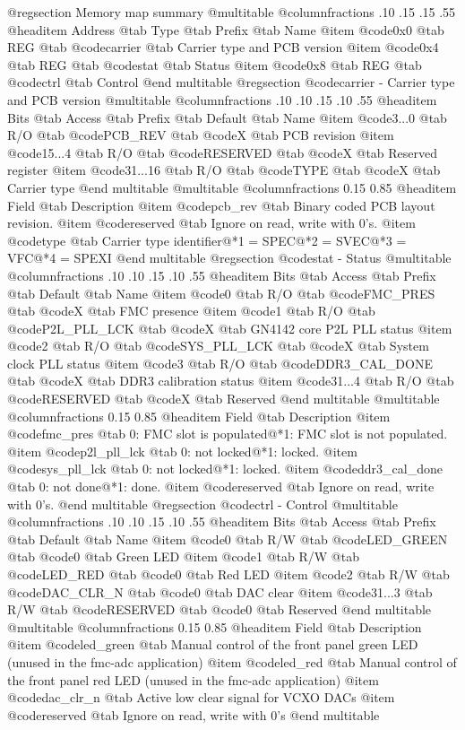 @regsection Memory map summary
@multitable  @columnfractions .10 .15 .15 .55
@headitem Address @tab Type @tab Prefix @tab Name
@item @code{0x0} @tab
REG @tab
@code{carrier} @tab
Carrier type and PCB version
@item @code{0x4} @tab
REG @tab
@code{stat} @tab
Status
@item @code{0x8} @tab
REG @tab
@code{ctrl} @tab
Control
@end multitable 
@regsection @code{carrier} - Carrier type and PCB version
@multitable @columnfractions .10 .10 .15 .10 .55
@headitem Bits @tab Access @tab Prefix @tab Default @tab Name
@item @code{3...0}
@tab R/O @tab
@code{PCB_REV}
@tab @code{X} @tab 
PCB revision
@item @code{15...4}
@tab R/O @tab
@code{RESERVED}
@tab @code{X} @tab 
Reserved register
@item @code{31...16}
@tab R/O @tab
@code{TYPE}
@tab @code{X} @tab 
Carrier type
@end multitable
@multitable @columnfractions 0.15 0.85
@headitem Field @tab Description
@item @code{pcb_rev} @tab Binary coded PCB layout revision.
@item @code{reserved} @tab Ignore on read, write with 0's.
@item @code{type} @tab Carrier type identifier@*1 = SPEC@*2 = SVEC@*3 = VFC@*4 = SPEXI
@end multitable
@regsection @code{stat} - Status
@multitable @columnfractions .10 .10 .15 .10 .55
@headitem Bits @tab Access @tab Prefix @tab Default @tab Name
@item @code{0}
@tab R/O @tab
@code{FMC_PRES}
@tab @code{X} @tab 
FMC presence
@item @code{1}
@tab R/O @tab
@code{P2L_PLL_LCK}
@tab @code{X} @tab 
GN4142 core P2L PLL status
@item @code{2}
@tab R/O @tab
@code{SYS_PLL_LCK}
@tab @code{X} @tab 
System clock PLL status
@item @code{3}
@tab R/O @tab
@code{DDR3_CAL_DONE}
@tab @code{X} @tab 
DDR3 calibration status
@item @code{31...4}
@tab R/O @tab
@code{RESERVED}
@tab @code{X} @tab 
Reserved
@end multitable
@multitable @columnfractions 0.15 0.85
@headitem Field @tab Description
@item @code{fmc_pres} @tab 0: FMC slot is populated@*1: FMC slot is not populated.
@item @code{p2l_pll_lck} @tab 0: not locked@*1: locked.
@item @code{sys_pll_lck} @tab 0: not locked@*1: locked.
@item @code{ddr3_cal_done} @tab 0: not done@*1: done.
@item @code{reserved} @tab Ignore on read, write with 0's.
@end multitable
@regsection @code{ctrl} - Control
@multitable @columnfractions .10 .10 .15 .10 .55
@headitem Bits @tab Access @tab Prefix @tab Default @tab Name
@item @code{0}
@tab R/W @tab
@code{LED_GREEN}
@tab @code{0} @tab 
Green LED
@item @code{1}
@tab R/W @tab
@code{LED_RED}
@tab @code{0} @tab 
Red LED
@item @code{2}
@tab R/W @tab
@code{DAC_CLR_N}
@tab @code{0} @tab 
DAC clear
@item @code{31...3}
@tab R/W @tab
@code{RESERVED}
@tab @code{0} @tab 
Reserved
@end multitable
@multitable @columnfractions 0.15 0.85
@headitem Field @tab Description
@item @code{led_green} @tab Manual control of the front panel green LED (unused in the fmc-adc application)
@item @code{led_red} @tab Manual control of the front panel red LED (unused in the fmc-adc application)
@item @code{dac_clr_n} @tab Active low clear signal for VCXO DACs
@item @code{reserved} @tab Ignore on read, write with 0's
@end multitable
